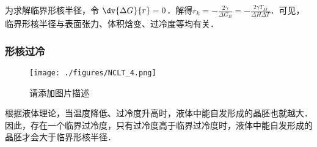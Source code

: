 为求解临界形核半径，令 $\dv{\Delta G}{r} = 0$．解得$r_k=-\frac{2\gamma}{\Delta G_B}=-\frac{2\gamma T_M}{\Delta H \Delta T}$．可见，临界形核半径与表面张力、体积焓变、过冷度等均有关．

\subsubsection{形核过冷}
\begin{figure}[ht]
\centering
\texttt{[image: ./figures/NCLT\_4.png]}
\caption{请添加图片描述} \label{NCLT_fig4}
\end{figure}
根据液体理论，当温度降低、过冷度升高时，液体中能自发形成的晶胚也就越大．因此，存在一个临界过冷度，只有过冷度高于临界过冷度时，液体中能自发形成的晶胚才会大于临界形核半径．
